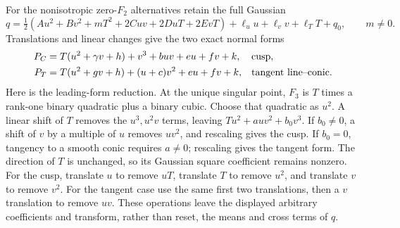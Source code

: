 \documentclass[11pt]{article}
\theoremstyle{definition}\newtheorem{definition}[theorem]{Definition}
\theoremstyle{remark}\newtheorem{remark}[theorem]{Remark}
\begin{document}
For the nonisotropic zero-$F_2$ alternatives retain the full Gaussian
\[
 q=\tfrac12(Au^2+Bv^2+mT^2+2Cuv+2DuT+2EvT)
                  +\ell_u u+\ell_v v+\ell_TT+q_0,
 \qquad m\ne0.
\]
Translations and linear changes give the two exact normal forms
\begin{align}
 P_C&=T(u^2+\gamma v+h)+v^3+buv+eu+fv+k,
                       &&\hbox{cusp},\label{eq:cuspnormal}\\
 P_T&=T(u^2+gv+h)+(u+c)v^2+eu+fv+k,
                       &&\hbox{tangent line--conic}.\label{eq:tangentnormal}
\end{align}
Here is the leading-form reduction. At the unique singular
point, $F_3$ is $T$ times a rank-one binary quadratic plus a
binary cubic. Choose that quadratic as $u^2$. A linear shift
of $T$ removes the $u^3,u^2v$ terms, leaving
$Tu^2+a uv^2+b_0v^3$. If $b_0\ne0$, a shift of $v$ by a
multiple of $u$ removes $uv^2$, and rescaling gives the cusp.
If $b_0=0$, tangency to a smooth conic requires $a\ne0$;
rescaling gives the tangent form. The direction of $T$ is
unchanged, so its Gaussian square coefficient remains nonzero.
For the cusp, translate $u$ to remove $uT$, translate $T$ to
remove $u^2$, and translate $v$ to remove $v^2$. For the tangent
case use the same first two translations, then a $v$ translation
to remove $uv$. These operations leave the displayed arbitrary
coefficients and transform, rather than reset, the means and
cross terms of $q$.
\end{document}
